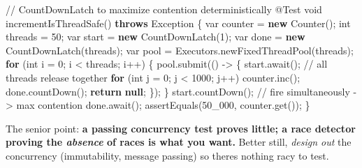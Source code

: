\documentclass[11pt]{article}
\newenvironment{Shaded}{\begin{snugshade}}{\end{snugshade}}
\newcommand{\AttributeTok}[1]{\textcolor[rgb]{0.16,0.50,0.73}{#1}}
\newcommand{\BuiltInTok}[1]{\textcolor[rgb]{0.50,0.55,0.55}{#1}}
\newcommand{\CommentTok}[1]{\textcolor[rgb]{0.48,0.49,0.49}{#1}}
\newcommand{\ControlFlowTok}[1]{\textcolor[rgb]{0.99,0.74,0.29}{\textbf{#1}}}
\newcommand{\DataTypeTok}[1]{\textcolor[rgb]{0.16,0.50,0.73}{#1}}
\newcommand{\DecValTok}[1]{\textcolor[rgb]{0.96,0.45,0.00}{#1}}
\newcommand{\FunctionTok}[1]{\textcolor[rgb]{0.56,0.27,0.68}{#1}}
\newcommand{\KeywordTok}[1]{\textcolor[rgb]{0.81,0.81,0.76}{\textbf{#1}}}
\newcommand{\NormalTok}[1]{\textcolor[rgb]{0.81,0.81,0.76}{#1}}
\newcommand{\OperatorTok}[1]{\textcolor[rgb]{0.81,0.81,0.76}{#1}}
\begin{document}
\begin{Shaded}
\begin{Highlighting}[]
\CommentTok{// CountDownLatch to maximize contention deterministically}
\AttributeTok{@Test}
\DataTypeTok{void} \FunctionTok{incrementIsThreadSafe}\OperatorTok{()} \KeywordTok{throws} \BuiltInTok{Exception} \OperatorTok{\{}
    \DataTypeTok{var}\NormalTok{ counter }\OperatorTok{=} \KeywordTok{new} \FunctionTok{Counter}\OperatorTok{();}
    \DataTypeTok{int}\NormalTok{ threads }\OperatorTok{=} \DecValTok{50}\OperatorTok{;}
    \DataTypeTok{var}\NormalTok{ start }\OperatorTok{=} \KeywordTok{new} \BuiltInTok{CountDownLatch}\OperatorTok{(}\DecValTok{1}\OperatorTok{);}
    \DataTypeTok{var}\NormalTok{ done  }\OperatorTok{=} \KeywordTok{new} \BuiltInTok{CountDownLatch}\OperatorTok{(}\NormalTok{threads}\OperatorTok{);}
    \DataTypeTok{var}\NormalTok{ pool  }\OperatorTok{=} \BuiltInTok{Executors}\OperatorTok{.}\FunctionTok{newFixedThreadPool}\OperatorTok{(}\NormalTok{threads}\OperatorTok{);}
    \ControlFlowTok{for} \OperatorTok{(}\DataTypeTok{int}\NormalTok{ i }\OperatorTok{=} \DecValTok{0}\OperatorTok{;}\NormalTok{ i }\OperatorTok{\textless{}}\NormalTok{ threads}\OperatorTok{;}\NormalTok{ i}\OperatorTok{++)} \OperatorTok{\{}
\NormalTok{        pool}\OperatorTok{.}\FunctionTok{submit}\OperatorTok{(()} \OperatorTok{{-}\textgreater{}} \OperatorTok{\{}
\NormalTok{            start}\OperatorTok{.}\FunctionTok{await}\OperatorTok{();}                  \CommentTok{// all threads release together}
            \ControlFlowTok{for} \OperatorTok{(}\DataTypeTok{int}\NormalTok{ j }\OperatorTok{=} \DecValTok{0}\OperatorTok{;}\NormalTok{ j }\OperatorTok{\textless{}} \DecValTok{1000}\OperatorTok{;}\NormalTok{ j}\OperatorTok{++)}\NormalTok{ counter}\OperatorTok{.}\FunctionTok{inc}\OperatorTok{();}
\NormalTok{            done}\OperatorTok{.}\FunctionTok{countDown}\OperatorTok{();}
            \ControlFlowTok{return} \KeywordTok{null}\OperatorTok{;}
        \OperatorTok{\});}
    \OperatorTok{\}}
\NormalTok{    start}\OperatorTok{.}\FunctionTok{countDown}\OperatorTok{();}                      \CommentTok{// fire simultaneously {-}\textgreater{} max contention}
\NormalTok{    done}\OperatorTok{.}\FunctionTok{await}\OperatorTok{();}
    \FunctionTok{assertEquals}\OperatorTok{(}\DecValTok{50\_000}\OperatorTok{,}\NormalTok{ counter}\OperatorTok{.}\FunctionTok{get}\OperatorTok{());}
\OperatorTok{\}}
\end{Highlighting}
\end{Shaded}

The senior point: \textbf{a passing concurrency test proves little; a race detector proving the \emph{absence} of races is what you want.} Better still, \emph{design out} the concurrency (immutability, message passing) so there\textquotesingle s nothing racy to test.
\end{document}
